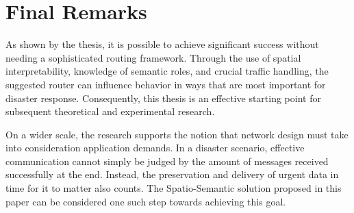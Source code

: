 \section*{Final Remarks}
As shown by the thesis, it is possible to achieve significant success without needing a sophisticated routing framework. Through the use of spatial interpretability, knowledge of semantic roles, and crucial traffic handling, the suggested router can influence behavior in ways that are most important for disaster response. Consequently, this thesis is an effective starting point for subsequent theoretical and experimental research.

On a wider scale, the research supports the notion that network design must take into consideration application demands. In a disaster scenario, effective communication cannot simply be judged by the amount of messages received successfully at the end. Instead, the preservation and delivery of urgent data in time for it to matter also counts. The Spatio-Semantic solution proposed in this paper can be considered one such step towards achieving this goal.
